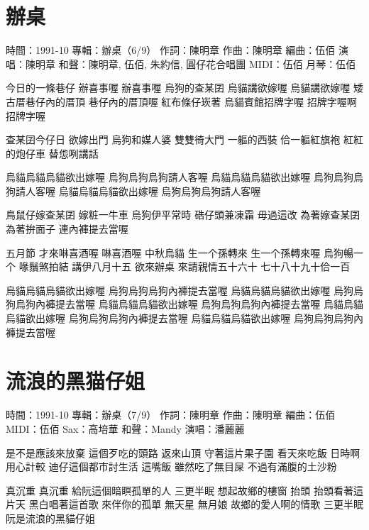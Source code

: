 \documentclass[UTF8,a4paper,oneside,twocolumn,12pt]{ctexbook}
\newcommand{\infopair}[2]{\textbullet #1：#2}
\newcommand{\zc}[1][伍佰]{\infopair{作詞}{#1}}
\newcommand{\zq}[1][伍佰]{\infopair{作曲}{#1}}
\newcommand{\bq}[1][伍佰]{\infopair{編曲}{#1}}
\newcommand{\zj}[1]{\infopair{專輯}{#1}}
\newcommand{\sj}[1]{\infopair{時間}{#1}}
\newenvironment{info}{\begin{flushleft}\kaishu
	}
	{\end{flushleft}\normalsize\yahei\par}
\newenvironment{lyric}{
	}
{}
\begin{document}
\section{辦桌}
\begin{info}
	\sj{1991-10}
	\zj{辦桌（6/9）}
	\zc[陳明章]
	\zq[陳明章]
	\bq[伍佰]
	\infopair{演唱}{陳明章}
	\infopair{和聲}{陳明章, 伍佰, 朱約信, 圓仔花合唱團}
	\infopair{MIDI}{伍佰}
	\infopair{月琴}{伍佰}
\end{info}
\begin{lyric}
	今日的一條巷仔
	辦喜事喔
	辦喜事喔
	烏狗的查某囝
	烏貓講欲嫁喔
	烏貓講欲嫁喔
	矮古厝巷仔內的厝頂
	巷仔內的厝頂喔
	紅布條仔崁著
	烏貓賓館招牌字喔
	招牌字喔啊招牌字喔

	查某囝今仔日
	欲嫁出門
	烏狗和媒人婆
	雙雙徛大門
	一軀的西裝
	佮一軀紅旗袍
	紅紅的炮仔車
	替怹咧講話

	烏貓烏貓烏貓欲出嫁喔
	烏狗烏狗烏狗請人客喔
	烏貓烏貓烏貓欲出嫁喔
	烏狗烏狗烏狗請人客喔
	烏貓烏貓烏貓欲出嫁喔
	烏狗烏狗烏狗請人客喔

	鳥鼠仔嫁查某囝
	嫁粧一牛車
	烏狗伊平常時
	硞仔頭兼凍霜
	毋過這改
	為著嫁查某囝
	為著拚面子
	連內褲提去當喔

	五月節
	才來啉喜酒喔
	啉喜酒喔
	中秋烏貓
	生一个孫轉來
	生一个孫轉來喔
	烏狗暢一个
	喙鬚煞拍結
	講伊八月十五
	欲來辦桌
	來請親情五十六十
	七十八十九十佮一百

	烏貓烏貓烏貓欲出嫁喔
	烏狗烏狗烏狗內褲提去當喔
	烏貓烏貓烏貓欲出嫁喔
	烏狗烏狗烏狗內褲提去當喔
	烏貓烏貓烏貓欲出嫁喔
	烏狗烏狗烏狗內褲提去當喔
	烏貓烏貓烏貓欲出嫁喔
	烏狗烏狗烏狗內褲提去當喔
	烏貓烏貓烏貓欲出嫁喔
	烏狗烏狗烏狗內褲提去當喔
\end{lyric}

\section{流浪的黑猫仔姐}
\begin{info}
	\sj{1991-10}
	\zj{辦桌（7/9）}
	\zc[陳明章]
	\zq[陳明章]
	\bq[伍佰]
	\infopair{MIDI}{伍佰}
	\infopair{Sax}{高培華}
	\infopair{和聲}{Mandy}
	\infopair{演唱}{潘麗麗}
\end{info}
\begin{lyric}
	是不是應該來放棄
	這個歹吃的頭路
	返來山頂
	守著這片果子園
	看天來吃飯
	日時啊用心計較
	迪仔這個都市討生活
	這嘴飯
	雖然吃了無目屎
	不過有滿腹的土沙粉

	真沉重
	真沉重
	給阮這個暗瞑孤單的人
	三更半眠
	想起故鄉的樓窗
	抬頭
	抬頭看著這片天
	黑白唱著這首歌
	來伴你的孤單
	無天星
	無月娘
	故鄉的愛人啊的情歌
	三更半眠
	阮是流浪的黑貓仔姐
\end{lyric}
\end{document}
